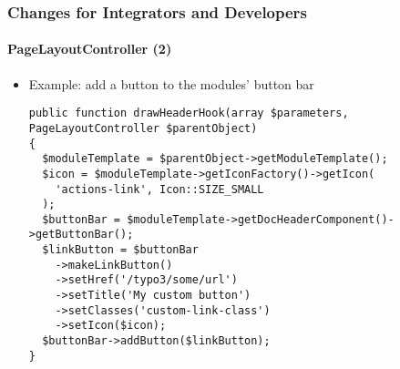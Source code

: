 %

\begin{frame}[fragile]
	\frametitle{Changes for Integrators and Developers}
	\framesubtitle{PageLayoutController (2)}


	\begin{itemize}
		\item Example: add a button to the modules' button bar
\begin{lstlisting}
public function drawHeaderHook(array $parameters, PageLayoutController $parentObject)
{
  $moduleTemplate = $parentObject->getModuleTemplate();
  $icon = $moduleTemplate->getIconFactory()->getIcon(
    'actions-link', Icon::SIZE_SMALL
  );
  $buttonBar = $moduleTemplate->getDocHeaderComponent()->getButtonBar();
  $linkButton = $buttonBar
    ->makeLinkButton()
    ->setHref('/typo3/some/url')
    ->setTitle('My custom button')
    ->setClasses('custom-link-class')
    ->setIcon($icon);
  $buttonBar->addButton($linkButton);
}
\end{lstlisting}

	\end{itemize}

\end{frame}

